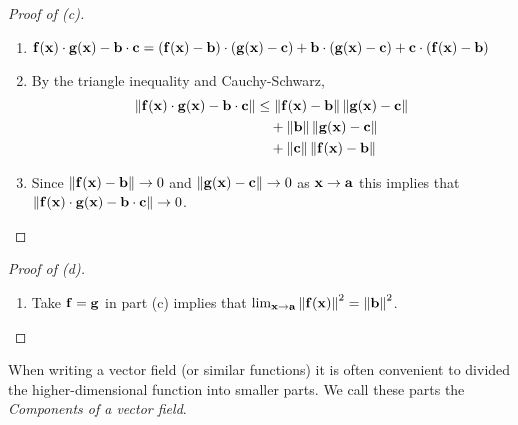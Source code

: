 \begin{proof}[Proof of (c)]
    \begin{enumerate}
        \item
              \(
              \mathbf{f}(\mathbf{x})\cdot\mathbf{g}(\mathbf{x}) - \mathbf{b}\cdot \mathbf{c}
              = (\mathbf{f}(\mathbf{x})-\mathbf{b})\cdot(\mathbf{g}(\mathbf{x})-\mathbf{c}) + \mathbf{b}\cdot(\mathbf{g}(\mathbf{x})-\mathbf{c}) + \mathbf{c}\cdot(\mathbf{f}(\mathbf{x})-\mathbf{b})
              \)
        \item By the triangle inequality and Cauchy-Schwarz,
              \[
                  \begin{aligned}
                      \left\|\mathbf{f}(\mathbf{x})\cdot\mathbf{g}(\mathbf{x}) - \mathbf{b}\cdot \mathbf{c} \right\|
                       & \leq \left\|\mathbf{f}(\mathbf{x})-\mathbf{b}\right\| \left\|\mathbf{g}(\mathbf{x})-\mathbf{c}\right\| \\
                       & \quad + \left\|\mathbf{b}\right\|\left\|\mathbf{g}(\mathbf{x})-\mathbf{c}\right\|        \\
                       & \quad + \left\|\mathbf{c}\right\| \left\|\mathbf{f}(\mathbf{x})-\mathbf{b}\right\|
                  \end{aligned}
              \]
        \item Since \(\left\|\mathbf{f}(\mathbf{x})-\mathbf{b}\right\| \to 0\) and \(\left\|\mathbf{g}(\mathbf{x})-\mathbf{c}\right\| \to 0\) as \(\mathbf{x} \to \mathbf{a}\) this implies that \(\left\|\mathbf{f}(\mathbf{x})\cdot\mathbf{g}(\mathbf{x}) - \mathbf{b}\cdot \mathbf{c} \right\|\to 0\).
    \end{enumerate}
\end{proof}

\begin{proof}[Proof of (d)]
    \begin{enumerate}
        \item Take \(\mathbf{f} = \mathbf{g}\) in part (c) implies that \(   \lim_{\mathbf{x} \to \mathbf{a}} \left\|\mathbf{f}(\mathbf{x})\right\|^2 = \left\|\mathbf{b}\right\|^2\).
    \end{enumerate}
\end{proof}


When writing a vector field (or similar functions) it is often convenient to divided the higher-dimensional function into smaller parts. 
We call these parts the \emph{Components of a vector field}.

